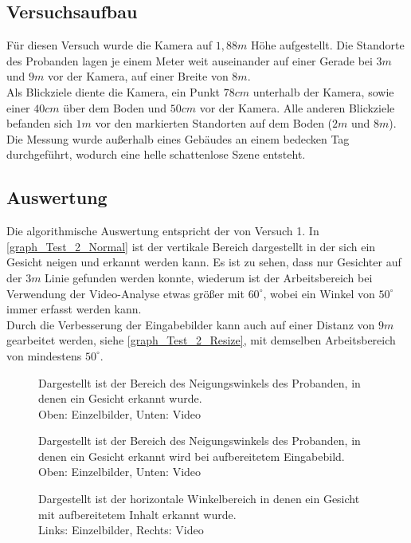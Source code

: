 \subsection{Versuchsaufbau}
Für diesen Versuch wurde die Kamera auf $1,88m$ Höhe aufgestellt. Die Standorte des Probanden lagen je einem Meter weit auseinander auf einer Gerade bei $3m$ und $9m$ vor der Kamera, auf einer Breite von $8m$.\\
Als Blickziele diente die Kamera, ein Punkt $78cm$ unterhalb der Kamera, sowie einer $40cm$ über dem Boden und $50cm$ vor der Kamera. Alle anderen Blickziele befanden sich $1m$ vor den markierten Standorten auf dem Boden ($2m$ und $8m$).\\
Die Messung wurde außerhalb eines Gebäudes an einem bedecken Tag durchgeführt, wodurch eine helle schattenlose Szene entsteht.
\subsection{Auswertung}
Die algorithmische Auswertung entspricht der von Versuch 1. In \autoref{graph_Test_2_Normal} ist der vertikale Bereich dargestellt in der sich ein Gesicht neigen und erkannt werden kann. Es ist zu sehen, dass nur Gesichter auf der $3m$ Linie gefunden werden konnte, wiederum ist der Arbeitsbereich bei Verwendung der Video-Analyse etwas größer mit $60^\circ$, wobei ein Winkel von $50^\circ$ immer erfasst werden kann.\\
Durch die Verbesserung der Eingabebilder kann auch auf einer Distanz von $9m$ gearbeitet werden, siehe \autoref{graph_Test_2_Resize}, mit demselben Arbeitsbereich von mindestens $50^\circ$.
\begin{figure}[!h]
	\centering
		
	\caption{Dargestellt ist der Bereich des Neigungswinkels des Probanden, in denen ein Gesicht erkannt wurde.\\
		Oben: Einzelbilder, Unten: Video}
	\label{graph_Test_2_Normal}
\end{figure}
\begin{figure}
\centering
	
	\caption{Dargestellt ist der Bereich des Neigungswinkels des Probanden, in denen ein Gesicht erkannt wird bei aufbereitetem Eingabebild.\\
	Oben: Einzelbilder, Unten: Video}
\label{graph_Test_2_Resize}
\end{figure}
\begin{figure}
	\centering
	
	
	\caption{Dargestellt ist der horizontale Winkelbereich in denen ein Gesicht mit aufbereitetem Inhalt erkannt wurde.\\
		Links: Einzelbilder, Rechts: Video}
	\label{graph_Test_1_Resize}
\end{figure}
